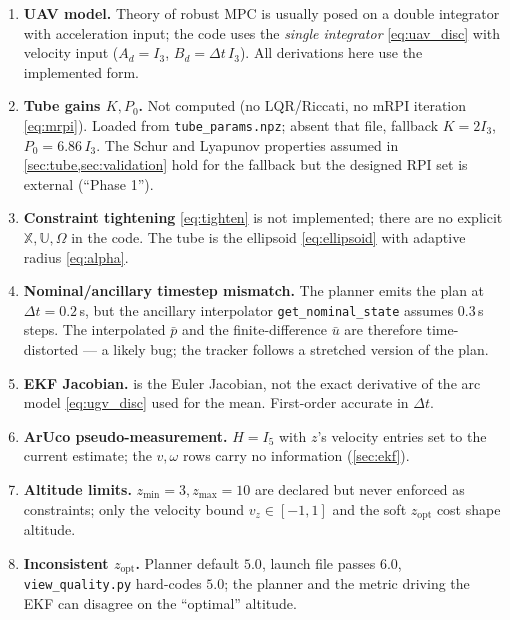 \documentclass[11pt]{article}
\newcommand{\Xset}{\mathbb{X}}
\newcommand{\Uset}{\mathbb{U}}
\newcommand{\bu}{\bar{u}}
\newcommand{\bp}{\bar{p}}
\newcommand{\code}[1]{\texttt{#1}}
\newcommand{\opt}{\mathrm{opt}}
\begin{document}
\begin{enumerate}
\item \textbf{UAV model.} Theory of robust MPC is usually posed on a double integrator with acceleration
input; the code uses the \emph{single integrator} \cref{eq:uav_disc} with velocity input ($A_d=I_3$,
$B_d=\Delta t\,I_3$). All derivations here use the implemented form.

\item \textbf{Tube gains $K,P_0$.} Not computed (no LQR/Riccati, no mRPI iteration \cref{eq:mrpi}). Loaded from
\code{tube\_params.npz}; absent that file, fallback $K=2I_3$, $P_0=6.86\,I_3$. The Schur and Lyapunov
properties assumed in \cref{sec:tube,sec:validation} hold for the fallback but the designed RPI set is
external (``Phase 1'').

\item \textbf{Constraint tightening} \cref{eq:tighten} is not implemented; there are no explicit
$\Xset,\Uset,\Omega$ in the code. The tube is the ellipsoid \cref{eq:ellipsoid} with adaptive radius
\cref{eq:alpha}.

\item \textbf{Nominal/ancillary timestep mismatch.} The planner emits the plan at $\Delta t=0.2$\,s, but the
ancillary interpolator \code{get\_nominal\_state} assumes $0.3$\,s steps. The interpolated $\bp$ and the
finite-difference $\bu$ are therefore time-distorted --- a likely bug; the tracker follows a stretched version
of the plan.

\item \textbf{EKF Jacobian.}  is the Euler Jacobian, not the exact derivative of the arc model
\cref{eq:ugv_disc} used for the mean. First-order accurate in $\Delta t$.

\item \textbf{ArUco pseudo-measurement.} $H=I_5$ with $z$'s velocity entries set to the current estimate; the
$v,\omega$ rows carry no information (\cref{sec:ekf}).

\item \textbf{Altitude limits.} $z_{\min}=3,z_{\max}=10$ are declared but never enforced as constraints; only
the velocity bound $v_z\in[-1,1]$ and the soft $z_\opt$ cost shape altitude.

\item \textbf{Inconsistent $z_\opt$.} Planner default $5.0$, launch file passes $6.0$, \code{view\_quality.py}
hard-codes $5.0$; the planner and the metric driving the EKF can disagree on the ``optimal'' altitude.


\end{enumerate}
\end{document}
